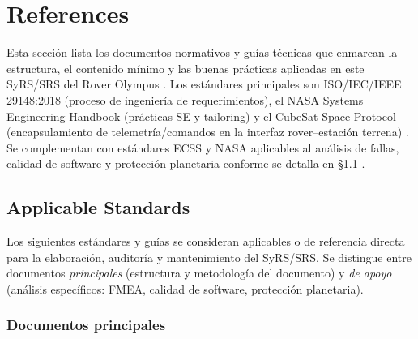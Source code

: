 
\section{References}

Esta sección lista los documentos normativos y guías técnicas que enmarcan la estructura, el contenido mínimo y las buenas prácticas aplicadas en este SyRS/SRS del Rover Olympus \cite{ieee_29148, segoldmine_ppi}. Los estándares principales son ISO/IEC/IEEE 29148:2018 (proceso de ingeniería de requerimientos), el NASA Systems Engineering Handbook (prácticas SE y tailoring) y el CubeSat Space Protocol (encapsulamiento de telemetría/comandos en la interfaz rover–estación terrena) \cite{ieee_29148, nasa_se_handbook, csp_spec}. Se complementan con estándares ECSS y NASA aplicables al análisis de fallas, calidad de software y protección planetaria conforme se detalla en \S\ref{subsec:applicable_standards} \cite{ecss_e_st_10_06c, ecss_q_st_30, nasa_std_8739_8, nasa_planetary_protection}.

\subsection{Applicable Standards}\label{subsec:applicable_standards}

Los siguientes estándares y guías se consideran aplicables o de referencia directa para la elaboración, auditoría y mantenimiento del SyRS/SRS. Se distingue entre documentos \emph{principales} (estructura y metodología del documento) y \emph{de apoyo} (análisis específicos: FMEA, calidad de software, protección planetaria).

\subsubsection*{Documentos principales}

